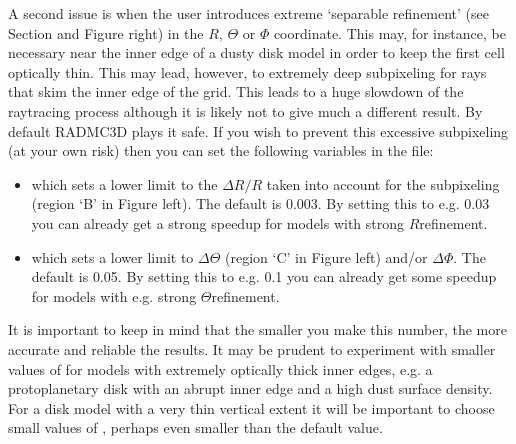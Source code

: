 \documentclass[letterpaper,10pt,english]{sphinxmanual}
\begin{document}
A second issue is when the user introduces extreme ‘separable refinement’
(see Section {\hyperref[\detokenize{gridding:sec-separable-refinement}]{}} and Figure
\sphinxhyphen{}right) in the \(R\), \(\Theta\) or \(\Phi\)
coordinate. This may, for instance, be necessary near the inner edge of a
dusty disk model in order to keep the first cell optically thin. This may
lead, however, to extremely deep sub\sphinxhyphen{}pixeling for rays that skim the inner
edge of the grid. This leads to a huge slow\sphinxhyphen{}down of the ray\sphinxhyphen{}tracing process
although it is likely not to give much a different result. By default
RADMC\sphinxhyphen{}3D plays it safe. If you wish to prevent this excessive sub\sphinxhyphen{}pixeling
(at your own risk) then you can set the following variables in the
 file:
\begin{itemize}
\item {} 
 which sets a lower limit to the \(\Delta
R/R\) taken into account for the sub\sphinxhyphen{}pixeling (region ‘B’ in Figure
\sphinxhyphen{}left). The default is 0.003. By setting this to
e.g. 0.03 you can already get a strong speed\sphinxhyphen{}up for models with strong
\(R\)\sphinxhyphen{}refinement.

\item {} 
 which sets a lower limit to
\(\Delta\Theta\) (region ‘C’ in Figure \sphinxhyphen{}left)
and/or \(\Delta\Phi\). The default is 0.05. By setting this to e.g. 0.1 you
can already get some speed\sphinxhyphen{}up for models with e.g. strong
\(\Theta\)\sphinxhyphen{}refinement.

\end{itemize}

It is important to keep in mind that the smaller you make this number, the
more accurate and reliable the results. It may be prudent to experiment with
smaller values of  for models with extremely
optically thick inner edges, e.g. a protoplanetary disk with an abrupt
inner edge and a high dust surface density. For a disk model with a very
thin vertical extent it will be important to choose small values of
, perhaps even smaller than the default
value.
\end{document}
